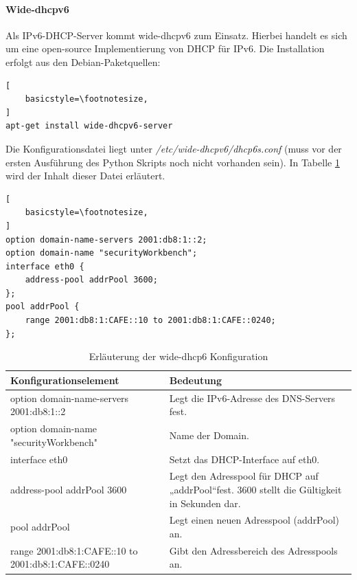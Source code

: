 \paragraph*{Wide-dhcpv6}
Als IPv6-DHCP-Server kommt wide-dhcpv6 zum Einsatz. Hierbei handelt es sich um eine open-source Implementierung von DHCP für IPv6. Die Installation erfolgt aus den Debian-Paketquellen:
\lstset{language=bash}
\begin{lstlisting}[
	basicstyle=\footnotesize,
]
apt-get install wide-dhcpv6-server
\end{lstlisting}

Die Konfigurationsdatei liegt unter \textit{/etc/wide-dhcpv6/dhcp6s.conf} (muss vor der ersten Ausführung des Python Skripts noch nicht vorhanden sein). In Tabelle \ref{tab:wideDhcpConfig} wird der Inhalt dieser Datei erläutert.
\begin{lstlisting}[
	basicstyle=\footnotesize,
]
option domain-name-servers 2001:db8:1::2;
option domain-name "securityWorkbench";
interface eth0 {
	address-pool addrPool 3600;
};
pool addrPool {
	range 2001:db8:1:CAFE::10 to 2001:db8:1:CAFE::0240;
};

\end{lstlisting}

\begin{table}
	\centering
		\begin{tabular}{lp{9cm}}
			Konfigurationselement & Bedeutung \\ \hline
			option domain-name-servers 2001:db8:1::2 & Legt die IPv6-Adresse des DNS-Servers fest. \\
			option domain-name "securityWorkbench" & Name der Domain. \\
			interface eth0 & Setzt das DHCP-Interface auf eth0. \\
			address-pool addrPool 3600 & Legt den Adresspool für DHCP auf „addrPool“fest. 3600 stellt die Gültigkeit in Sekunden dar.  \\
			pool addrPool & Legt einen neuen Adresspool (addrPool) an. \\
			range 2001:db8:1:CAFE::10 to 2001:db8:1:CAFE::0240 & Gibt den Adressbereich des Adresspools an. \\
		\end{tabular}
	\caption{Erläuterung der wide-dhcp6 Konfiguration}
	\label{tab:wideDhcpConfig}
\end{table}

\FloatBarrier


